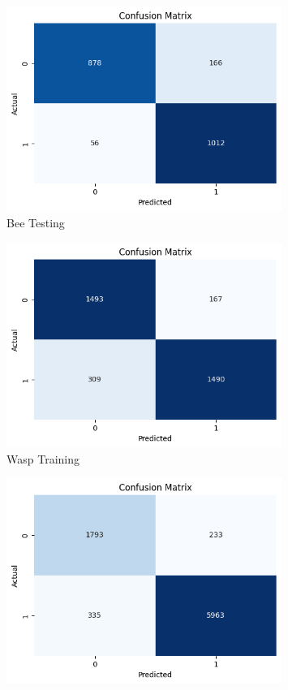 \documentclass[12pt]{article}
\begin{document}
\begin{enumerate}
\begin{figure}[H]
\begin{minipage}{0.45\textwidth}
				\includegraphics[width=0.8\textwidth]{Images/Confusion/res bees test.png} \\ \vspace{0.25 cm}
				Bee Testing
			\end{minipage}
			\newline
			\begin{minipage}{0.45\textwidth}
				\vspace{ 1.5 cm}
				\centering
				\includegraphics[width=0.8\textwidth]{Images/Confusion/res wasps train.png} \\ \vspace{0.25 cm}
				Wasp Training
			\end{minipage}
			\hfill
			\begin{minipage}{0.45\textwidth}
				\centering
				\includegraphics[width=0.8\textwidth]{Images/Confusion/res wasps test.png} \\ \vspace{0.25 cm}

\end{minipage}
\end{figure}
\end{enumerate}
\end{document}
